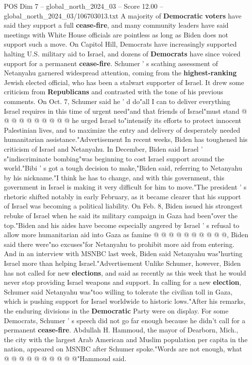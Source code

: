 \begin{textsample}{POS Dim 7 – global\_north\_2024\_03 – Score 12.00 – global\_north\_2024\_03/106703013.txt}
A majority of \textbf{Democratic} \textbf{voters} have said they support a full \textbf{cease-fire}, and many community leaders have said meetings with White House officials are pointless as long as Biden does not support such a move.
On Capitol Hill, Democrats have increasingly supported halting U.S. military aid to Israel, and dozens of \textbf{Democrats} have since voiced support for a permanent \textbf{cease-fire}.
Schumer ' s scathing assessment of Netanyahu garnered widespread attention, coming from the \textbf{highest-ranking} Jewish elected official, who has been a stalwart supporter of Israel.
It drew some criticism from \textbf{Republicans} and contrasted with the tone of his previous comments.
On Oct. 7, Schumer said he ' d do"all I can to deliver everything Israel requires in this time of urgent need"and that friends of Israel"must stand @ @ @ @ @ @ @ @ @ @ he urged Israel to"intensify its efforts to protect innocent Palestinian lives, and to maximize the entry and delivery of desperately needed humanitarian assistance."Advertisement In recent weeks, Biden has toughened his criticism of Israel and Netanyahu.
In December, Biden said Israel ' s"indiscriminate bombing"was beginning to cost Israel support around the world."Bibi ' s got a tough decision to make,"Biden said, referring to Netanyahu by his nickname."I think he has to change, and with this government, this government in Israel is making it very difficult for him to move."The president ' s rhetoric shifted notably in early February, as it became clearer that his support of Israel was becoming a political liability.
On Feb. 8, Biden issued his strongest rebuke of Israel when he said its military campaign in Gaza had been"over the top."Biden and his aides have become especially angered by Israel ' s refusal to allow more humanitarian aid into Gaza as famine @ @ @ @ @ @ @ @ @ @, Biden said there were"no excuses"for Netanyahu to prohibit more aid from entering.
And in an interview with MSNBC last week, Biden said Netanyahu was"hurting Israel more than helping Israel."Advertisement Unlike Schumer, however, Biden has not called for new \textbf{elections}, and said as recently as this week that he would never stop providing Israel weapons and support.
In calling for a new \textbf{election}, Schumer said Netanyahu was"too willing to tolerate the civilian toll in Gaza, which is pushing support for Israel worldwide to historic lows."After his remarks, the enduring divisions in the \textbf{Democratic} Party were on display.
For some Democrats, Schumer ' s speech did not go far enough because he didn't call for a permanent \textbf{cease-fire}.
Abdullah H.
Hammoud, the mayor of Dearborn, Mich., the city with the largest Arab American and Muslim population per capita in the nation, appeared on MSNBC after Schumer spoke."Words are not enough, what @ @ @ @ @ @ @ @ @ @"Hammoud said.

\end{textsample}

